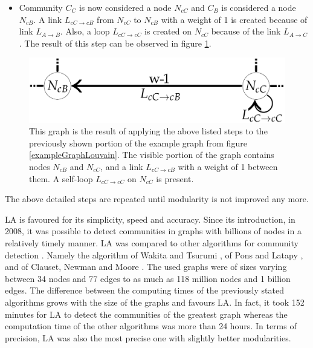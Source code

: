 \begin{enumerate}
  \label{LA5}
  \begin{itemize}
    \item Community $C_{C}$ is now considered a node $N_{cC}$ and $C_{B}$ is considered a node $N_{cB}$. A link $L_{cC\rightarrow cB}$ from $N_{cC}$ to $N_{cB}$ with a weight of 1 is created because  of link $L_{A\rightarrow B}$. Also, a loop $L_{cC\rightarrow cC}$ is created on $N_{cC}$ because of the link $L_{A\rightarrow C}$. The result of this step can be observed in figure \ref{exampleGraphLouvainEnde}.
  \end{itemize}  
\begin{figure}[ht!]
  \centering
  \includegraphics[width=\textwidth]{Images/graphForCommunityEnde.png}
  \caption{This graph is the result of applying the above listed steps to the previously shown portion of the example graph from figure \ref{exampleGraphLouvain}. The visible portion of the graph contains nodes $N_{cB}$ and $N_{cC}$, and a link $L_{cC\rightarrow cB}$ with a weight of 1 between them. A self-loop $L_{cC\rightarrow cC}$ on $N_{cC}$ is present.}
  \label{exampleGraphLouvainEnde}
\end{figure}     
\end{enumerate}
The above detailed steps are repeated until modularity is not improved any more.

LA is favoured for its simplicity, speed and accuracy. Since its introduction, in 2008, it was possible to detect communities in graphs with billions of nodes in a relatively timely manner. LA was compared to other algorithms for community detection \cite{louvainAlgorithm}.  Namely the algorithm of Wakita and Tsurumi \cite{wakitaAndToshiyuki}, of Pons and Latapy \cite{ponsAndLatapy}, and of Clauset, Newman and Moore \cite{CNM}. The used graphs were of sizes varying between 34 nodes and 77 edges to as much as 118 million nodes and 1 billion edges. The difference between the computing times of the previously stated algorithms grows with the size of the graphs and favours LA. In fact, it took 152 minutes for LA to detect the communities of the greatest graph whereas the computation time of the other algorithms was more than 24 hours. In terms of precision, LA was also the most precise one with slightly better modularities.


